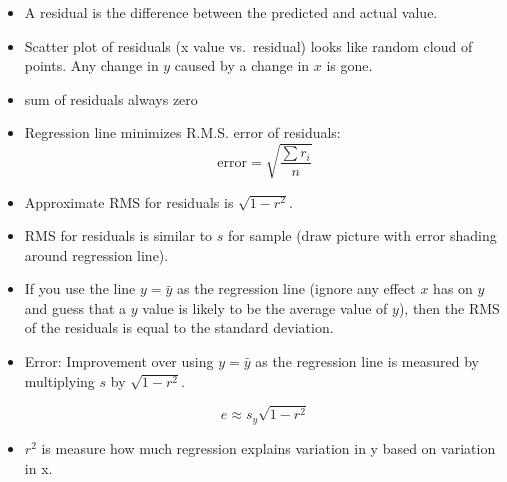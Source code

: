 \documentclass[letterpaper, landscape]{exam}
\begin{document}
  \begin{itemize}
    \item A residual is the difference between the predicted and actual value.

    \item Scatter plot of residuals (x value vs.\ residual) looks like random
      cloud of points. Any change in $y$ caused by a change in $x$ is gone.

    \item sum of residuals always zero

    \item Regression line minimizes R.M.S. error of residuals:
      \[
        \text{error} = \sqrt{\frac{\sum r_i}{n}}
      \]

    \item Approximate RMS for residuals is $\sqrt{1 - r^2}$.

    \item RMS for residuals is similar to $s$ for sample (draw picture with
      error shading around regression line). 

    \item If you use the line $y = \bar{y}$ as the regression line (ignore any
      effect $x$ has on $y$ and guess that a $y$ value is likely to be the
      average value of $y$), then the RMS of the residuals is equal to the
      standard deviation.

    \item Error:
      Improvement over using $y = \bar{y}$ as the regression line is measured by
      multiplying $s$ by $\sqrt{1 - r^2}$.

      \[
        e \approx s_y \sqrt{1 - r^2}
      \]


    \item $r^2$ is measure how much regression explains variation in y based on
      variation in x.

  \end{itemize}
\end{document}
